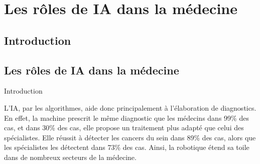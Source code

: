 \section{Les rôles de \textbf{IA} dans la médecine}
\subsection{\mybox Introduction}
\subsection{\mybox Les rôles de \textbf{IA} dans la médecine}

\begin{frame}{Introduction}
    \begin{enumerate}[<+-|alert@+>]
        \myitem L'IA, par les algorithmes, aide donc principalement à l'élaboration de
                diagnostics.
        \myitem En effet, la machine prescrit le même diagnostic que les
                médecins dans 99\% des cas, et dans 30\% des cas, elle propose un
                traitement plus adapté que celui des spécialistes. Elle réussit à
                détecter les cancers du sein dans 89\% des cas, alors que les
                spécialistes les détectent dans 73\% des cas.
        \myitem Ainsi, la robotique étend sa toile dans de nombreux secteurs de
            la médecine.\mybox
    \end{enumerate}
\end{frame}

